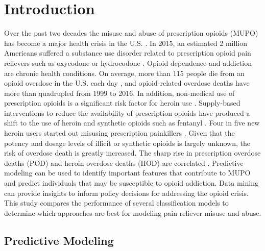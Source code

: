 \documentclass[sigconf]{acmart}
\begin{document}
\section{Introduction}

Over the past two decades the misuse and abuse of prescription opioids 
(MUPO) has become a major health crisis in the U.S. \cite{volkow14}. In 2015, 
an estimated 2 million Americans suffered a substance use disorder related 
to prescription opioid pain relievers such as oxycodone or hydrocodone 
\cite{nida18}. Opioid dependence and addiction are chronic health conditions. 
On average, more than 115 people die from an opioid overdose in the U.S. 
each day \cite{cdc18}, and opioid-related overdose deaths have more than 
quadrupled from 1999 to 2016. In addition, non-medical use of prescription 
opioids is a significant risk factor for heroin use \cite{Rudd16}. 
Supply-based interventions to reduce the availability of prescription opioids 
have produced a shift to the use of heroin and synthetic opioids such as 
fentanyl \cite{jones15}. Four in five new heroin users started out misusing 
prescription painkillers \cite{jones13}. Given that the potency and dosage 
levels of illicit or synthetic opioids is largely unknown, the risk of overdose
death is greatly increased. The sharp rise in prescription overdose deaths 
(POD) and heroin overdose deaths (HOD) are correlated \cite{muhuri13, unick13}. 
Predictive modeling can be used to identify important features that contribute 
to MUPO and predict individuals that may be susceptible to opioid addiction. 
Data mining can provide insights to inform policy decisions for addressing the 
opioid crisis. This study compares the performance of several classification 
models to determine which approaches are best for modeling pain reliever 
misuse and abuse. 


\subsection{Predictive Modeling}
\end{document}
